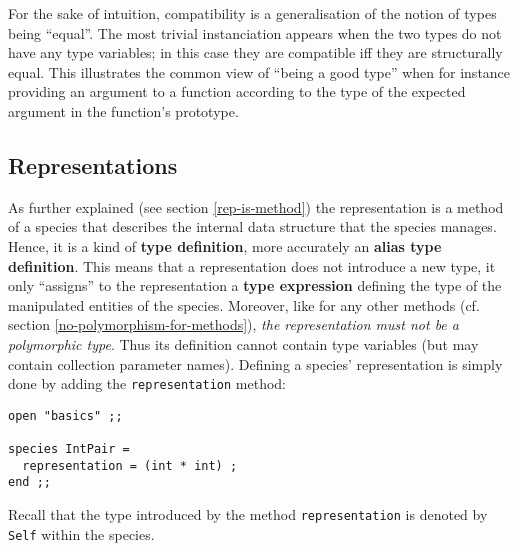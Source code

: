 \medskip
For the sake of intuition, compatibility is a generalisation of
the notion of types being ``equal''. The most trivial instanciation
appears when the two types do not have any type variables; in
this case they are compatible iff they are structurally equal. This
illustrates the common view of ``being a good type'' when for
instance providing an argument to a function according to the type of
the expected argument in the function's prototype.


\subsection{Representations}\label{representation-type}
As further explained (see section \ref{rep-is-method}) the
representation is a method of a species that describes the internal
data structure that the species manages. Hence, it is a kind of {\bf
  type definition}, more accurately an {\bf alias type
  definition}. This means that a representation does not introduce a
new type, it only ``assigns'' to the representation a {\bf type
  expression} defining the type of the manipulated entities of the
species. Moreover, like for any other methods (cf. section
\ref{no-polymorphism-for-methods}), {\em the representation must not
  be a polymorphic type}. Thus its definition cannot
contain type variables (but may contain collection parameter
names). Defining a species' representation is simply done by adding the
{\tt representation} method:
 {\scriptsize
\begin{lstlisting}
open "basics" ;;

species IntPair =
  representation = (int * int) ;
end ;;
\end{lstlisting}
}

Recall that the type introduced by the method {\tt representation} is
denoted by {\tt Self} within the species.

\vspace{0.2cm}
\begin{syn}
 \is {} 
\end{syn}

